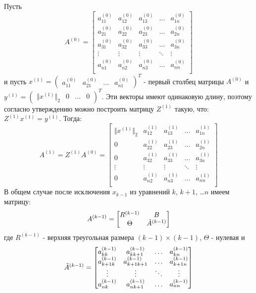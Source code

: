 \documentclass[a4paper,12pt,titlepage,final]{article}
\begin{document}
Пусть 
$$A^{(0)} = \begin{bmatrix}
a_{11}^{(0)} & a_{12}^{(0)} & a_{13}^{(0)} & \ldots & a_{1n}^{(0)} \\
a_{21}^{(0)} & a_{22}^{(0)} & a_{23}^{(0)} & \ldots & a_{2n}^{(0)} \\
a_{31}^{(0)} & a_{32}^{(0)} & a_{33}^{(0)} & \ldots & a_{3n}^{(0)} \\
\vdots & \vdots & \vdots & \ddots & \vdots \\
a_{n1}^{(0)} & a_{n2}^{(0)} & a_{n3}^{(0)} & \ldots & a_{nn}^{(0)} \\
\end{bmatrix} $$
и пусть $x^{(1)} = \begin{pmatrix} a_{11}^{(0)} & a_{21}^{(0)} & \ldots & a_{n1}^{(0)}\end{pmatrix}^T$ - первый столбец матрицы $A^{(0)}$ и $y^{(1)} = \begin{pmatrix} \Vert x^{(1)} \Vert_2 & 0 & \ldots & 0\end{pmatrix}^T$. Эти векторы имеют одинаковую длину, поэтому согласно утверждению можно построить матрицу $Z^{(1)}$ такую, что: $Z^{(1)}x^{(1)} = y^{(1)}$. Тогда:
$$A^{(1)} = Z^{(1)}A^{(0)} = 
\begin{bmatrix}
\Vert x^{(1)} \Vert_2 & a_{12}^{(1)} & a_{13}^{(1)} & \ldots & a_{1n}^{(1)} \\
0 & a_{22}^{(1)} & a_{23}^{(1)} & \ldots & a_{2n}^{(1)} \\
0 & a_{32}^{(1)} & a_{33}^{(1)} & \ldots & a_{3n}^{(1)} \\
\vdots & \vdots & \vdots & \ddots & \vdots \\
0 & a_{n2}^{(1)} & a_{n3}^{(1)} & \ldots & a_{nn}^{(1)} \\
\end{bmatrix}$$
В общем случае после исключения $x_{k-1}$ из уравнений $k$, $k+1$, \ldots $n$ имеем матрицу:
$$ A^{(k-1)} = \begin{bmatrix}
    R^{(k-1)} & B \\
    \Theta & \Tilde{A}^{(k-1)}
\end{bmatrix}
$$
где $R^{(k-1)}$ - верхняя треугольная размера $(k-1)\times(k-1)$, $\Theta$ - нулевая и $$\Tilde{A}^{(k-1)} = \begin{bmatrix}
    a_{kk}^{(k-1)} & a_{kk+1}^{(k-1)} & \ldots & a_{kn}^{(k-1)} \\
    a_{k+1k}^{(k-1)} & a_{k+1k+1}^{(k-1)} & \ldots & a_{k+1n}^{(k-1)} \\
    \vdots & \vdots & \ddots & \vdots \\
    a_{nk}^{(k-1)} & a_{nk+1}^{(k-1)} & \ldots & a_{nn}^{(k-1)} \\
\end{bmatrix}
$$
\end{document}
